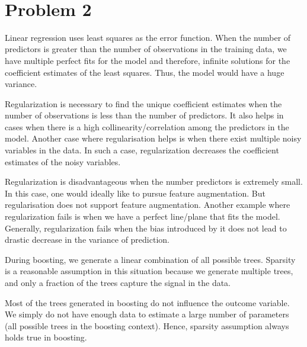 \documentclass[11pt]{article}
\begin{document}
\begin{center}

\ \\
\end{center}

\section*{Problem 2}

\vspace{5 mm}
\noindent
Linear regression uses least squares as the error function. When the number of predictors is
greater than the number of observations in the training data, we have multiple perfect fits for the
model and therefore, infinite solutions for the coefficient estimates of the least squares. Thus, the model
would have a huge variance.

Regularization is necessary to find the unique coefficient estimates when the number of observations is less than
the number of predictors. It also helps in cases when there is a high collinearity/correlation among the predictors in the model. Another case where regularisation helps is when there exist multiple noisy variables in the data. In such a case, regularization decreases the coefficient estimates of the noisy variables. 

Regularization is disadvantageous when the number predictors is extremely small. In this case, one would ideally like 
to pursue feature augmentation. But regularisation does not support feature augmentation. Another example where regularization fails is when we have a perfect line/plane that fits the model. 
Generally, regularization fails when the bias introduced by it does not lead to drastic decrease in the variance of prediction. 

During boosting, we generate a linear combination of all possible trees. Sparsity is a reasonable assumption in this situation because we generate multiple trees, and only a fraction of the trees capture the signal in the data. 

Most of the trees generated in boosting do not influence the outcome variable. We simply do not have enough data to estimate a large number of parameters (all possible trees in the boosting context). Hence, sparsity assumption always holds true in boosting.


\vspace{5 mm}
\noindent
\end{document}
